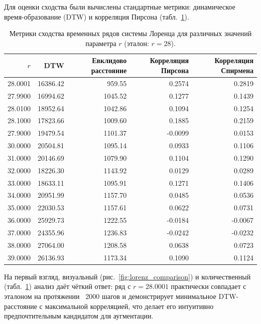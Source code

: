 \documentclass[a4paper,12pt]{extarticle}
\begin{document}
Для оценки сходства были вычислены стандартные метрики: динамическое время-образование
 (DTW) и корреляция Пирсона (табл.~\ref{tab:lorenz_metrics}).

\begin{table}[htbp]
\centering
\caption{Метрики сходства временных рядов системы Лоренца для различных значений параметра \(r\) (эталон: \(r=28\)).}
\label{tab:lorenz_metrics}
\begin{tabular}{|r|r|r|r|r|}
\hline
\(r\) & DTW & Евклидово расстояние & Корреляция Пирсона & Корреляция Спирмена \\
\hline
28.0001 & 16386.42 & 959.55 & 0.2574 & 0.2819 \\
\hline
27.9900 & 16994.62 & 1045.52 & 0.1277 & 0.1439 \\
\hline
28.0100 & 18952.64 & 1042.86 & 0.1094 & 0.1254 \\
\hline
28.1000 & 17823.66 & 1009.60 & 0.1885 & 0.2159 \\
\hline
27.9000 & 19479.54 & 1101.37 & -0.0099 & 0.0153 \\
\hline
30.0000 & 20504.81 & 1095.14 & 0.0933 & 0.1106 \\
\hline
31.0000 & 20146.69 & 1079.90 & 0.1104 & 0.1290 \\
\hline
32.0000 & 18226.30 & 1143.92 & 0.0129 & 0.0289 \\
\hline
33.0000 & 18633.11 & 1095.91 & 0.1271 & 0.1406 \\
\hline
34.0000 & 20951.99 & 1157.70 & 0.0485 & 0.0536 \\
\hline
35.0000 & 22030.53 & 1157.61 & 0.0622 & 0.0731 \\
\hline
36.0000 & 25929.73 & 1222.55 & -0.0184 & -0.0067 \\
\hline
37.0000 & 24355.96 & 1236.83 & -0.0242 & -0.0232 \\
\hline
38.0000 & 27064.00 & 1208.58 & 0.0638 & 0.0723 \\
\hline
39.0000 & 26136.93 & 1173.34 & 0.1090 & 0.1124 \\
\hline
\end{tabular}
\end{table}

На первый взгляд, визуальный (рис.~\ref{fig:lorenz_comparison}) и количественный 
(табл.~\ref{tab:lorenz_metrics}) анализ даёт чёткий ответ: ряд с \(r=28.0001\) практически
совпадает с эталоном на протяжении ~2000 шагов и демонстрирует минимальное DTW-расстояние
 с максимальной корреляцией, что делает его интуитивно предпочтительным кандидатом для аугментации.
\end{document}

